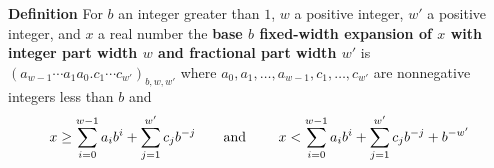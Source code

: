 
{\bf Definition} For $b$ an integer greater than $1$, $w$ a positive integer, 
$w'$ a positive  integer, and $x$ a real number the {\bf base $b$ fixed-width 
expansion of $x$ with integer part width $w$  and fractional part width $w'$} is
$(a_{w-1} \cdots a_1 a_0 .  c_{1} \cdots c_{w'})_{b,w,w'}$
where  $a_0, a_1, \ldots, a_{w-1}, c_1, \ldots, c_{w'}$ are nonnegative integers less than $b$ and
$$x \geq \sum_{i=0}^{w-1} a_{i} b^{i} + \sum_{j=1}^{w'}  c_{j} b^{-j} \hfill
\textrm{\qquad and \qquad}
\hfill x < \sum_{i=0}^{w-1} a_{i} b^{i} + \sum_{j=1}^{w'} c_{j} b^{-j} + b^{-w'}$$
